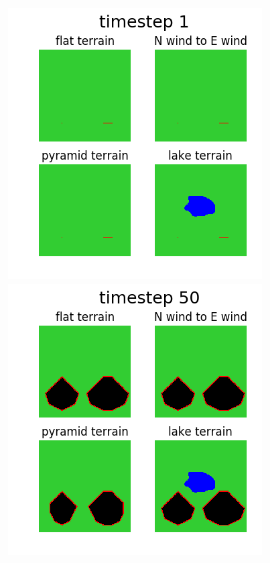 \documentclass{article}
\begin{document}
\begin{figure}
\includegraphics[width=0.6\textwidth]{figures/multi_im000.png} \includegraphics[width=0.6\textwidth]{figures/multi_im049.png}

\end{figure}
\end{document}
